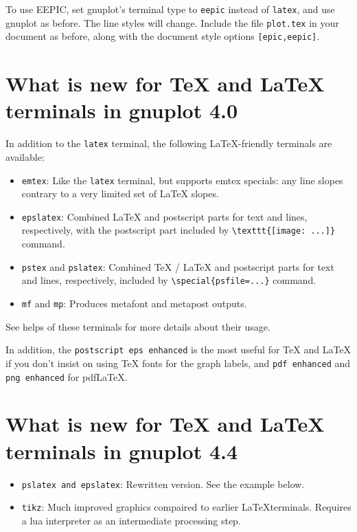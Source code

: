 To use EEPIC, set gnuplot's terminal type to {\tt eepic} instead of
{\tt latex}, and use gnuplot as before. The line styles will change.
Include the file {\tt plot.tex} in your document as before, along with
the document style options {\tt [epic,eepic]}.

\section{What is new for \TeX{} and \LaTeX{} terminals in gnuplot 4.0}

In addition to the \texttt{latex} terminal, the following \LaTeX-friendly
terminals are available:

\begin{itemize}
\item \texttt{emtex}: Like the \texttt{latex} terminal, but supports emtex
specials: any line slopes contrary to a very limited set of \LaTeX{} slopes.

\item \texttt{epslatex}: Combined \LaTeX{} and postscript parts for text and
lines, respectively, with the postscript part included by
\verb+\texttt{[image: ...]}+ command.

\item \texttt{pstex} and \texttt{pslatex}: Combined \TeX{} / \LaTeX{} and 
postscript parts for text and lines, respectively, included by
\verb+\special{psfile=...}+ command.

\item \texttt{mf} and \texttt{mp}: Produces metafont and metapost outputs.

\end{itemize}

See helps of these terminals for more details about their usage.

In addition, the \texttt{postscript eps enhanced} is the most useful for \TeX{}
and \LaTeX{} if you don't insist on using \TeX{} fonts for the graph labels, and
\texttt{pdf enhanced} and \texttt{png enhanced} for pdf\LaTeX{}.

\section{What is new for \TeX{} and \LaTeX{} terminals in gnuplot 4.4}

\begin{itemize}

\item \texttt{pslatex and epslatex}:  Rewritten version.  See the example below. 

\item \texttt{tikz}:  Much improved graphics compaired to earlier \LaTeX terminals.  
Requires a lua interpreter as an intermediate processing step.

\end{itemize}

